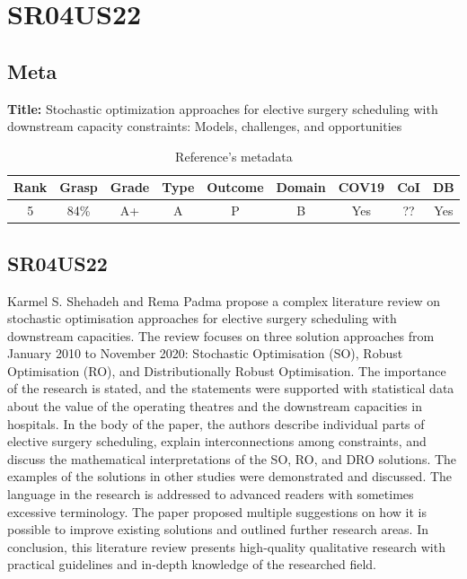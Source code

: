 \section{ SR04US22 }


\subsection{Meta}

    \textbf{Title:}
    Stochastic optimization approaches for elective surgery scheduling with downstream capacity constraints: Models, challenges, and opportunities

    \begin{table}[H]
        \centering
        \begin{tabular}{|c|c|c|c|c|c|c|c|c|}
            \hline
                \textbf{Rank} & \textbf{Grasp} & \textbf{Grade} & \textbf{Type} & \textbf{Outcome} & \textbf{Domain} & \textbf{COV19} & \textbf{CoI} & \textbf{DB} \\
            \hline
                5 & 84\% & A+ & A & P & B & Yes & ?? & Yes \\
            \hline
        \end{tabular}
        \caption{Reference's metadata}
        \label{tab:SR02CN23}
    \end{table}

\subsection{SR04US22}
    Karmel S. Shehadeh and Rema Padma \cite{x335} propose a complex literature review on stochastic optimisation approaches for elective surgery scheduling with downstream capacities. The review focuses on three solution approaches from January 2010 to November 2020: Stochastic Optimisation (SO), Robust Optimisation (RO), and Distributionally Robust Optimisation. The importance of the research is stated, and the statements were supported with statistical data about the value of the operating theatres and the downstream capacities in hospitals. In the body of the paper, the authors describe individual parts of elective surgery scheduling, explain interconnections among constraints, and discuss the mathematical interpretations of the SO, RO, and DRO solutions. The examples of the solutions in other studies were demonstrated and discussed. The language in the research is addressed to advanced readers with sometimes excessive terminology. The paper proposed multiple suggestions on how it is possible to improve existing solutions and outlined further research areas. In conclusion, this literature review presents high-quality qualitative research with practical guidelines and in-depth knowledge of the researched field.   

